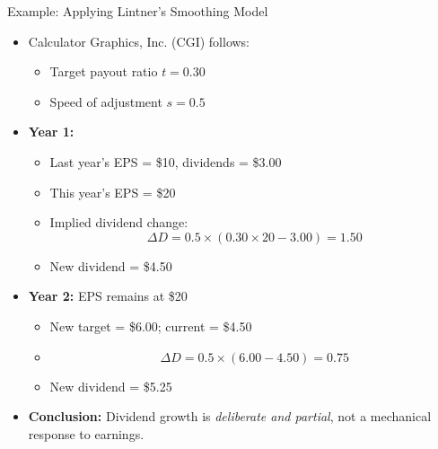 \begin{frame}{Example: Applying Lintner's Smoothing Model}
\footnotesize
\begin{itemize}
    \item Calculator Graphics, Inc. (CGI) follows:
    \begin{itemize}
        \item Target payout ratio $t = 0.30$
        \item Speed of adjustment $s = 0.5$
    \end{itemize}

    \item \textbf{Year 1:}
    \begin{itemize}
        \item Last year's EPS = \$10, dividends = \$3.00
        \item This year's EPS = \$20
        \item Implied dividend change:
        \[
        \Delta D = 0.5 \times (0.30 \times 20 - 3.00) = 1.50
        \]
        \item New dividend = \$4.50
    \end{itemize}

    \item \textbf{Year 2:} EPS remains at \$20
    \begin{itemize}
        \item New target = \$6.00; current = \$4.50
        \item \[
        \Delta D = 0.5 \times (6.00 - 4.50) = 0.75
        \]
        \item New dividend = \$5.25
    \end{itemize}

    \item \textbf{Conclusion:} Dividend growth is \textit{deliberate and partial}, not a mechanical response to earnings.
\end{itemize}
\end{frame}

